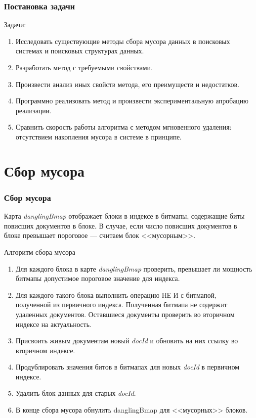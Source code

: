 \documentclass[aspectratio=169, pdf, 8pt, unicode]{beamer}
\begin{document}
\begin{frame}[fragile]
    \frametitle{Постановка задачи}
    {\large Задачи:}
    \vspace{5mm}
    \begin{enumerate}
    \item Исследовать существующие методы сбора мусора данных в поисковых системах и поисковых структурах данных.
    \vspace{5mm}
    \item Разработать метод с требуемыми свойствами.
    \vspace{5mm}
    \item Произвести анализ иных свойств метода, его преимуществ и недостатков.
    \vspace{5mm}
    \item Программно реализовать метод и произвести экспериментальную апробацию реализации.
    \vspace{5mm}
    \item Сравнить скорость работы алгоритма с методом мгновенного удаления: отсутствием накопления
    мусора в системе в принципе.
    \end{enumerate}
    \end{frame}

\section{Сбор мусора}

\begin{frame}[fragile]
\frametitle{Сбор мусора}

Карта \textit{danglingBmap} отображает блоки в индексе в битмапы,
содержащие биты повисших документов в блоке. В случае, если число повисших документов в блоке превышает пороговое — считаем блок <<мусорным>>.

\begin{block}{Алгоритм сбора мусора}
    \begin{enumerate}
        \item Для каждого блока в карте \textit{danglingBmap} проверить, превышает ли мощность битмапы допустимое пороговое значение для индекса.
        \item Для каждого такого блока выполнить операцию НЕ И с битмапой, полученной из первичного индекса. Полученная битмапа не содержит удаленных документов. Оставшиеся документы проверить во вторичном индексе на актуальность.
        \item Присвоить живым документам новый \textit{docId} и обновить на них ссылку во вторичном индексе.
        \item Продублировать значения битов в битмапах для новых \textit{docId} в первичном индексе.
        \item Удалить блок данных для старых \textit{docId}.
        \item В конце сбора мусора обнулить danglingBmap для <<мусорных>> блоков.
    \end{enumerate}
\end{block}
\end{frame}
\end{document}
